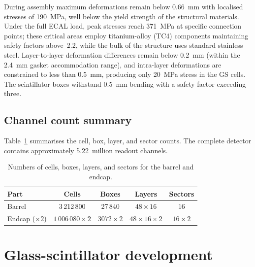 \documentclass[preprint,12pt,times]{elsarticle}
\begin{document}
During assembly maximum deformations remain below \SI{0.66}{mm} with
localised stresses of \SI{190}{MPa}, well below the yield strength of
the structural materials.
Under the full ECAL load, peak stresses reach \SI{371}{MPa} at specific
connection points; these critical areas employ titanium-alloy (TC4)
components maintaining safety factors above~2.2, while the bulk of the
structure uses standard stainless steel.
Layer-to-layer deformation differences remain below \SI{0.2}{mm}
(within the \SI{2.4}{mm} gasket accommodation range), and intra-layer
deformations are constrained to less than \SI{0.5}{mm}, producing only
\SI{20}{MPa} stress in the GS cells.
The scintillator boxes withstand \SI{0.5}{mm} bending with a safety
factor exceeding three.

\subsection{Channel count summary}
\label{subsec:summary_design}

Table~\ref{tab:GSHCALQuantities} summarises the cell, box, layer, and
sector counts.
The complete detector contains approximately 5.22~million readout
channels.

\begin{table}[htbp]
\centering
\caption{Numbers of cells, boxes, layers, and sectors for the barrel and
endcap.}
\label{tab:GSHCALQuantities}
\begin{tabular}{lcccc}
\toprule
\textbf{Part} & \textbf{Cells} & \textbf{Boxes} & \textbf{Layers} &
\textbf{Sectors} \\
\midrule
Barrel             & 3\,212\,800          & 27\,840        & $48\times16$
& 16 \\
Endcap ($\times2$) & $1\,006\,080\times2$ & $3072\times2$  &
$48\times16\times2$ & $16\times2$ \\
\bottomrule
\end{tabular}
\end{table}

\section{Glass-scintillator development}
\label{sec:gsdev}
\end{document}
